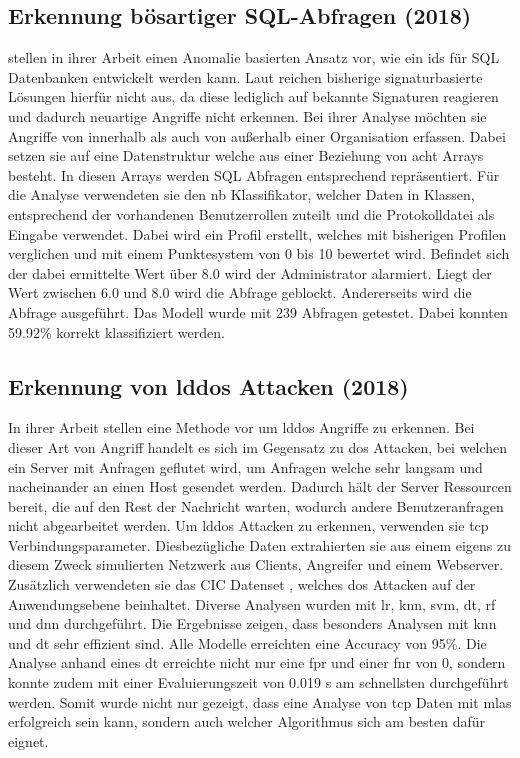 \documentclass[
    12pt, %
    DIV10,
    ngerman, %
    a4paper, %
    oneside, %
    titlepage, %
    parskip=half, %
    headings=normal, %
    listof=totoc, %
    bibliography=totoc, %
    index=totoc, %
    captions=tableheading, %
    final %
]{scrreprt}
\begin{document}
\subsection{Erkennung bösartiger SQL-Abfragen (2018)}
\textcite{Jayaprakash2018} stellen in ihrer Arbeit einen Anomalie basierten Ansatz vor, wie ein \ac{ids} für SQL Datenbanken entwickelt werden kann. Laut \textcite{Jayaprakash2018} reichen bisherige signaturbasierte Lösungen hierfür nicht aus, da diese lediglich auf bekannte Signaturen reagieren und dadurch neuartige Angriffe nicht erkennen. Bei ihrer Analyse möchten sie Angriffe von innerhalb als auch von au{\ss}erhalb einer Organisation erfassen. Dabei setzen sie auf eine Datenstruktur welche aus einer Beziehung von acht Arrays besteht. In diesen Arrays werden SQL Abfragen entsprechend repräsentiert. Für die Analyse verwendeten sie den \acl{nb} Klassifikator, welcher Daten in Klassen, entsprechend der vorhandenen Benutzerrollen zuteilt und die Protokolldatei als Eingabe verwendet. Dabei wird ein Profil erstellt, welches mit bisherigen Profilen verglichen und mit einem Punktesystem von 0 bis 10 bewertet wird. Befindet sich der dabei ermittelte Wert über 8.0 wird der Administrator alarmiert. Liegt der Wert zwischen 6.0 und 8.0 wird die Abfrage geblockt. Andererseits wird die Abfrage ausgeführt. Das Modell wurde mit 239 Abfragen getestet. Dabei konnten 59.92\% korrekt klassifiziert werden.
%
\subsection{Erkennung von \acs{lddos} Attacken (2018)}\label{cic}
In ihrer Arbeit stellen \textcite{siracusano2018detection} eine Methode vor um \ac{lddos} Angriffe zu erkennen. Bei dieser Art von Angriff handelt es sich im Gegensatz zu \ac{dos} Attacken, bei welchen ein Server mit Anfragen geflutet wird, um Anfragen welche sehr langsam und nacheinander an einen Host gesendet werden. Dadurch hält der Server Ressourcen bereit, die auf den Rest der Nachricht warten, wodurch andere Benutzeranfragen nicht abgearbeitet werden. Um \ac{lddos} Attacken zu erkennen, verwenden sie \ac{tcp} Verbindungsparameter. Diesbezügliche Daten extrahierten sie aus einem eigens zu diesem Zweck simulierten Netzwerk aus Clients, Angreifer und einem Webserver. Zusätzlich verwendeten sie das CIC Datenset \parencite{jazi2017detecting}, welches \ac{dos} Attacken auf der Anwendungsebene beinhaltet.
Diverse Analysen wurden mit \ac{lr}, \ac{knn}, \ac{svm}, \ac{dt}, \ac{rf} und \ac{dnn} durchgeführt. Die Ergebnisse zeigen, dass besonders Analysen mit \ac{knn} und \ac{dt} sehr effizient sind. Alle Modelle erreichten eine Accuracy von 95\%. Die Analyse anhand eines \acl{dt} erreichte nicht nur eine \ac{fpr} und einer \ac{fnr} von 0, sondern konnte zudem mit einer Evaluierungszeit von 0.019 s am schnellsten durchgeführt werden. Somit wurde nicht nur gezeigt, dass eine Analyse von \ac{tcp} Daten mit \ac{mlas} erfolgreich sein kann, sondern auch welcher Algorithmus sich am besten dafür eignet.
%
\end{document}
